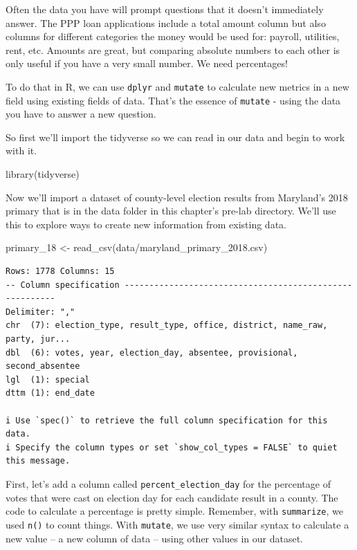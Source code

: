 \documentclass[
  letterpaper,
  DIV=11,
  numbers=noendperiod]{scrreprt}
\newenvironment{Shaded}{\begin{snugshade}}{\end{snugshade}}
\newcommand{\FunctionTok}[1]{\textcolor[rgb]{0.28,0.35,0.67}{#1}}
\newcommand{\NormalTok}[1]{\textcolor[rgb]{0.00,0.23,0.31}{#1}}
\newcommand{\OtherTok}[1]{\textcolor[rgb]{0.00,0.23,0.31}{#1}}
\newcommand{\StringTok}[1]{\textcolor[rgb]{0.13,0.47,0.30}{#1}}
\begin{document}
Often the data you have will prompt questions that it doesn't
immediately answer. The PPP loan applications include a total amount
column but also columns for different categories the money would be used
for: payroll, utilities, rent, etc. Amounts are great, but comparing
absolute numbers to each other is only useful if you have a very small
number. We need percentages!

To do that in R, we can use \texttt{dplyr} and \texttt{mutate} to
calculate new metrics in a new field using existing fields of data.
That's the essence of \texttt{mutate} - using the data you have to
answer a new question.

So first we'll import the tidyverse so we can read in our data and begin
to work with it.

\begin{Shaded}
\begin{Highlighting}[]
\FunctionTok{library}\NormalTok{(tidyverse)}
\end{Highlighting}
\end{Shaded}

Now we'll import a dataset of county-level election results from
Maryland's 2018 primary that is in the data folder in this chapter's
pre-lab directory. We'll use this to explore ways to create new
information from existing data.

\begin{Shaded}
\begin{Highlighting}[]
\NormalTok{primary\_18 }\OtherTok{\textless{}{-}} \FunctionTok{read\_csv}\NormalTok{(}\StringTok{\textquotesingle{}data/maryland\_primary\_2018.csv\textquotesingle{}}\NormalTok{)}
\end{Highlighting}
\end{Shaded}

\begin{verbatim}
Rows: 1778 Columns: 15
-- Column specification --------------------------------------------------------
Delimiter: ","
chr  (7): election_type, result_type, office, district, name_raw, party, jur...
dbl  (6): votes, year, election_day, absentee, provisional, second_absentee
lgl  (1): special
dttm (1): end_date

i Use `spec()` to retrieve the full column specification for this data.
i Specify the column types or set `show_col_types = FALSE` to quiet this message.
\end{verbatim}

First, let's add a column called \texttt{percent\_election\_day} for the
percentage of votes that were cast on election day for each candidate
result in a county. The code to calculate a percentage is pretty simple.
Remember, with \texttt{summarize}, we used \texttt{n()} to count things.
With \texttt{mutate}, we use very similar syntax to calculate a new
value -- a new column of data -- using other values in our dataset.
\end{document}
